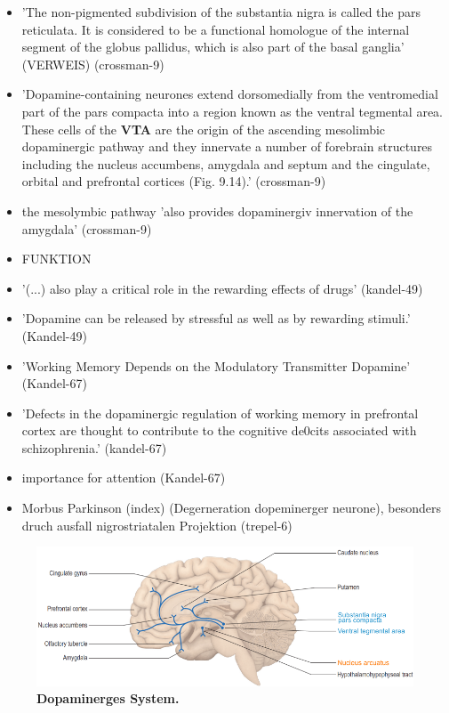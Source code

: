 \documentclass[12pt,a4paper,pdftex]{article}
\begin{document}
\begin{itemize}
    \item 'The non-pigmented subdivision of the substantia nigra is called the pars reticulata. It is considered to be a functional homologue of the internal segment of the globus pallidus, which is also part of the basal ganglia' (VERWEIS) (crossman-9)
    \item 'Dopamine-containing neurones extend dorsomedially from the ventromedial part of the pars compacta into a region known as the ventral tegmental area. These cells of the \textbf{VTA} are the origin of the ascending mesolimbic dopaminergic pathway and they innervate a number of forebrain structures including the nucleus accumbens, amygdala and septum and the cingulate, orbital and prefrontal cortices (Fig. 9.14).' (crossman-9)
    \item the mesolymbic pathway 'also provides dopaminergiv innervation of the amygdala' (crossman-9)
    \item FUNKTION
    \item '(...) also play a critical role in the rewarding effects of drugs' (kandel-49)
    \item 'Dopamine can be released by stressful as well as by rewarding stimuli.' (Kandel-49)
    \item 'Working Memory Depends on the Modulatory Transmitter Dopamine' (Kandel-67)
    \item 'Defects in the dopaminergic regulation of working memory in prefrontal cortex are thought to contribute to the cognitive de0cits associated with schizophrenia.' (kandel-67)
    \item importance for attention (Kandel-67)
    \item Morbus Parkinson (index) (Degerneration dopeminerger neurone), besonders druch ausfall nigrostriatalen Projektion (trepel-6)
\end{itemize}{}

\begin{figure}[H]
    \centering
    \includegraphics[width=\textwidth]{pictures/Bilder_monoamine_systeme/dopaminerges_system.PNG}
    \caption[Dopaminerges System]{\textbf{Dopaminerges System.}}
    \label{fig:dopaminerges_system}
\end{figure}{}
\end{document}
